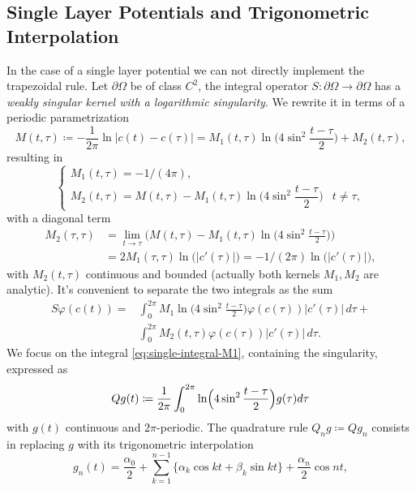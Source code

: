 \documentclass[10pt, a4paper, twoside, openright]{book}
\theoremstyle{definition}
\theoremstyle{plain}
\theoremstyle{plain}
\theoremstyle{plain}
\theoremstyle{plain}
\theoremstyle{plain}
\theoremstyle{plain}
\theoremstyle{plain}
\theoremstyle{plain}
\let\phi\varphi
\begin{document}
\subsection{Single Layer Potentials and Trigonometric Interpolation}
In the case of a single layer potential we can not directly implement the trapezoidal rule.
Let $\partial \Omega$ be of class $C^2$, the integral operator $S:\partial\Omega\to \partial\Omega$ has a \emph{weakly singular kernel with a logarithmic singularity}. We rewrite it in terms of a periodic parametrization
\begin{equation}
\label{eq:def-kernel-M}
 M(t,\tau)\coloneqq-\frac{1}{2\pi}\ln|c(t)-c(\tau)|=M_1(t,\tau)\ln\Big(4\sin^2\frac{t-\tau}{2}\Big)+M_2(t,\tau),
\end{equation}
resulting in
\begin{equation}
\begin{cases}
 M_1(t,\tau)= -1/(4\pi), \\
 M_2(t,\tau)=M(t,\tau) - M_1(t,\tau)\ln\Big(4\sin^2\dfrac{t-\tau}{2}\Big) & t\neq \tau,
\end{cases}
\end{equation}
with a diagonal term
\begin{align}
 M_2(\tau,\tau)&=\lim_{t\to\tau} \Big(M(t,\tau) - M_1(t,\tau)\ln\Big(4\sin^2\frac{t-\tau}{2}\Big)\Big) \\
 &=2M_1(\tau,\tau)\ln\big(|c'(\tau)|\big)=-1/(2\pi)\ln\big(|c'(\tau)|\big),
\end{align}
with $M_2(t,\tau)$ continuous and bounded (actually both kernels $M_1, M_2$ are analytic). It's convenient to separate the two integrals as the sum
\begin{align}
 S\phi(c(t)) =  &\int_0^{2\pi} M_1\ln\Big(4\sin^2\frac{t-\tau}{2}\Big)\phi(c(\tau))|c'(\tau)|\,d\tau + \label{eq:single-integral-M1}\\ 
                &\int_0^{2\pi} M_2(t,\tau)\phi(c(\tau))|c'(\tau)|\,d\tau \label{eq:single-integral-M2}.
\end{align}
We focus on the integral \eqref{eq:single-integral-M1}, containing the singularity, expressed as
\begin{equation}
 Qg(t)\coloneqq\frac{1}{2\pi}\int_0^{2\pi}\ln\Bigl(4\sin^2\frac{t-\tau}{2}\Bigr)g(\tau)d\tau
\end{equation}
with $g(t)$ continuous and $2\pi$-periodic. The quadrature rule 
$Q_ng\coloneqq Qg_n$ consists in replacing $g$ with its 
trigonometric interpolation 
\begin{equation}
 g_n(t)=\frac{\alpha_0}{2} + \sum_{k=1}^{n-1}\{\alpha_k\cos kt + \beta_k\sin kt\} + \frac{\alpha_n}{2}\cos nt,
\end{equation}
\end{document}
